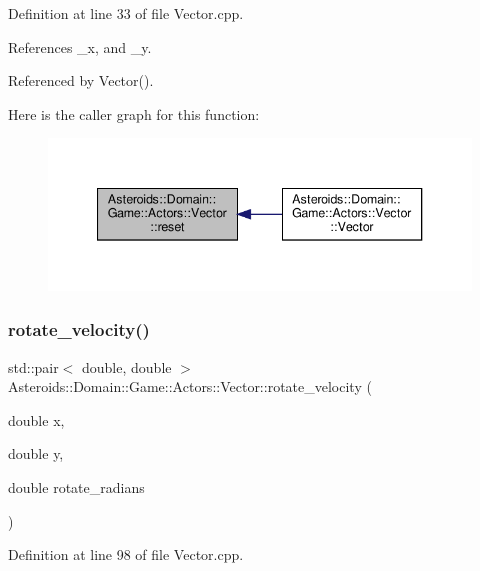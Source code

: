Definition at line 33 of file Vector.\+cpp.



References \+\_\+x, and \+\_\+y.



Referenced by Vector().

Here is the caller graph for this function\+:\nopagebreak
\begin{figure}[H]
\begin{center}
\leavevmode
\includegraphics[width=340pt]{classAsteroids_1_1Domain_1_1Game_1_1Actors_1_1Vector_afe2d6db6c1e45c6f3bf12404ee097200_icgraph}
\end{center}
\end{figure}
\mbox{\label{classAsteroids_1_1Domain_1_1Game_1_1Actors_1_1Vector_a540d3867c26c3cc6dafeb7a055cd392d}} 
\subsubsection{\texorpdfstring{rotate\+\_\+velocity()}{rotate\_velocity()}}
{\footnotesize\ttfamily std\+::pair$<$ double, double $>$ Asteroids\+::\+Domain\+::\+Game\+::\+Actors\+::\+Vector\+::rotate\+\_\+velocity (\begin{DoxyParamCaption}\item[{double}]{x,  }\item[{double}]{y,  }\item[{double}]{rotate\+\_\+radians }\end{DoxyParamCaption})\hspace{0.3cm}{\ttfamily [static]}}



Definition at line 98 of file Vector.\+cpp.



